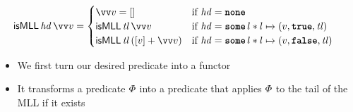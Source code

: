 \documentclass[thesis.tex]{subfiles}
\begin{document}
\begin{align*}
  \textlog{isMLL}\, \langv{hd}\, \vect{v} & =
  \begin{cases}
    \vect{v} = []                                   & \text{if } \langv{hd} = \None                                        \\
    \textlog{isMLL}\, \langv{tl}\, \vect{v}         & \text{if } \langv{hd} = \Some l * l \fmapsto (v, \True, \langv{tl})  \\
    \textlog{isMLL}\, \langv{tl}\, ([v] + \vect{v}) & \text{if } \langv{hd} = \Some l * l \fmapsto (v, \False, \langv{tl})
  \end{cases}
\end{align*}
\begin{itemize}
  \item We first turn our desired predicate into a functor
  \item It transforms a predicate $\varPhi$ into a predicate that applies $\varPhi$ to the tail of the MLL if it exists 
\end{itemize}
\end{document}
